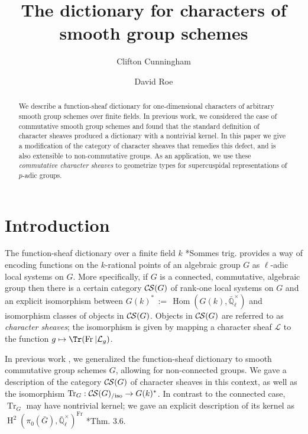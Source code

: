 \documentclass[10pt]{amsart}
\title[Commutative Character Sheaves]{The dictionary for characters of smooth group schemes}
\author{Clifton Cunningham}
\author{David Roe}
\theoremstyle{plain}
\theoremstyle{definition}
\newcommand{\EE}{\mathbb{\bar Q}_\ell}
\newcommand{\EEx}{\EE^\times}
\newcommand{\Frob}[1]{\operatorname{Fr}_{#1}}
\DeclareMathOperator{\Hom}{Hom}
\DeclareMathOperator{\Hh}{H}
\newcommand{\ceq}{{\, :=\, }}
\newcommand{\TrFrob}[1]{\operatorname{Tr}_{#1}}
\newcommand{\cs}[1]{{\mathcal{#1}}}
\newcommand{\CS}{{\mathcal{C\hskip-0.8pt S}}}
\newcommand{\CSiso}[1]{\CS(#1)_{/\text{iso}}}
\newcommand{\bG}{\bar{G}}
\begin{document}
\begin{abstract}
We describe a function-sheaf dictionary for one-dimensional characters of arbitrary smooth group schemes over finite fields.  
In previous work, we considered the case of commutative smooth group schemes and found that the standard definition of character sheaves produced a dictionary with a nontrivial kernel.  
In this paper we give a modification of the category of character sheaves that remedies this defect, and is also extensible to non-commutative groups.  
As an application, we use these \emph{commutative character sheaves} to geometrize types for supercuspidal representations of $p$-adic groups.
\end{abstract}

\maketitle

\tableofcontents

\section*{Introduction}

The function-sheaf dictionary over a finite field $k$ \cite{deligne:SGA4.5}*{Sommes trig.}
provides a way of encoding functions on the $k$-rational points of an algebraic group $G$
as $\ell$-adic local systems on $G$.  More specifically, if $G$ is a connected, commutative, algebraic group
then there is a certain category $\CS(G)$ of rank-one local systems on $G$ and an
explicit isomorphism between $G(k)^* \ceq \Hom(G(k), \EEx)$ and isomorphism classes
of objects in $\CS(G)$.  Objects in $\CS(G)$ are referred to as \emph{character sheaves};
the isomorphism is given by mapping a character sheaf $\cs{L}$ to the function
$g \mapsto \Tr(\Frob{} \vert \cs{L}_g)$.

In previous work \cite{cunningham-roe:13a}, we generalized the function-sheaf dictionary to
smooth commutative group schemes $G$, allowing for non-connected groups.
We gave a description of the category $\CS(G)$ of character sheaves in this context, as well
as the isomorphism $\TrFrob{G} : \CSiso{G} \to G(k)^*$.
In contrast to the connected case, $\TrFrob{G}$ may have nontrivial kernel;
we gave an explicit description of its kernel as $\Hh^2(\pi_0(\bG), \EEx)^{\Frob{}}$ \cite{cunningham-roe:13a}*{Thm. 3.6}.  
\end{document}
